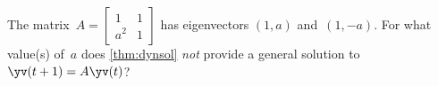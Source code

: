 \begin{activity}
The matrix~\(A=\begin{bmatrix} 1&1\\a^2&1 \end{bmatrix}\) has eigenvectors \((1,a)\) and~\((1,-a)\).
For what value(s) of~\(a\) does \autoref{thm:dynsol} \emph{not} provide a general solution to \(\yv(t+1)=A\yv(t)\)?
\end{activity}




